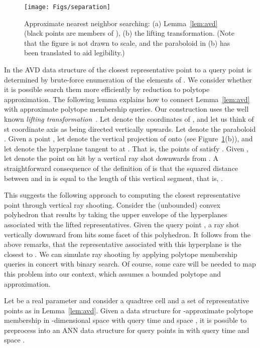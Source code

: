 \documentclass[11pt]{article}   \usepackage[letterpaper,hmargin=2.1cm,vmargin=3cm]{geometry}
\begin{document}
\begin{figure}[htbp]
  \centerline{\texttt{[image: Figs/separation]}}
  \caption{Approximate nearest neighbor searching: (a) Lemma~\ref{lem:avd} (black points are members of ), (b) the lifting transformation. (Note that the figure is not drawn to scale, and the paraboloid in (b) has been translated to aid legibility.)}
  \label{fig:separation}
\end{figure}


In the AVD data structure of \cite{AVD-JACM} the closest representative point to a query point is determined by brute-force enumeration of the elements of . We consider whether it is possible search them more efficiently by reduction to polytope approximation. The following lemma explains how to connect Lemma~\ref{lem:avd} with approximate polytope membership queries. Our construction uses the well known \emph{lifting transformation}~\cite{ray-shooting-NN,edels}. Let  denote the coordinates of , and let us think of st coordinate axis as being directed vertically upwards. Let  denote the paraboloid . Given a point , let  denote the vertical projection of  onto  (see Figure~\ref{fig:separation}(b)), and let  denote the hyperplane tangent to  at . That is, the points of  satisfy . Given , let  denote the point on  hit by a vertical ray shot downwards from . A straightforward consequence of the definition of  is that the squared distance between  and  in  is equal to the length of this vertical segment, that is, . 

This suggests the following approach to computing the closest representative point through vertical ray shooting. Consider the (unbounded) convex polyhedron that results by taking the upper envelope of the hyperplanes  associated with the lifted representatives. Given the query point , a ray shot vertically downward from  hits some facet of this polyhedron. It follows from the above remarks, that the representative associated with this hyperplane is the closest to . We can simulate ray shooting by applying polytope membership queries in concert with binary search. Of course, some care will be needed to map this problem into our context, which assumes a bounded polytope and approximation.

\begin{lemma} \label{lem:mini-reduction}
Let  be a real parameter and consider a quadtree cell  and a set of representative points  as in Lemma~\ref{lem:avd}. Given a data structure for -approximate polytope membership in -dimensional space with query time  and space , it is possible to preprocess  into an ANN data structure for query points in  with query time  and space .
\end{lemma}
\end{document}
